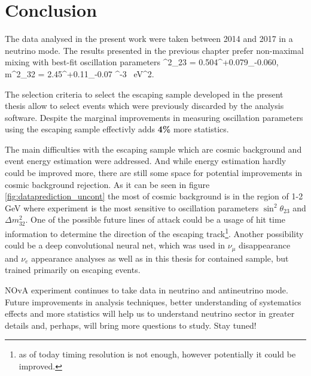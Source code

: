 \chapter{Conclusion}
\label{conclusion_chapter}

The data analysed in the present work were taken between 2014 and 2017 in a neutrino mode. The results 
presented in the previous chapter prefer non-maximal mixing with best-fit oscillation parameters 
\be
\sin^2\theta_{23} = 0.504^{+0.079}_{-0.060}, \nn
\ee
\be
\Delta m^2_{32} = 2.45^{+0.11}_{-0.07} ^{-3}~ eV^2. \nn
\ee

The selection criteria to select the escaping sample developed in the present thesis allow to select
events which were previously discarded by the analysis software. Despite the marginal improvements in measuring
oscillation parameters using the escaping sample effectivly adds \textbf{4\%} more statistics.

The main difficulties with the escaping sample which are cosmic background and event energy estimation were 
addressed. And while energy estimation hardly could be improved more, there are still some space for potential 
improvements in cosmic background rejection. As it can be seen in figure \ref{fig:dataprediction_uncont} the most 
of cosmic background is in the region of 1-2 GeV where experiment is the most sensitive to oscillation 
parameters $\sin^2\theta_{23}$ and $\Delta m^2_{32}$. One of the possible future lines of attack could be a
usage of hit time information to determine the direction of the escaping track\footnote{as of today timing resolution
is not enough, however potentially it could be improved.}. Another possibility could be a deep convolutional neural
net, which was used in $\nu_\mu$ disappearance and $\nu_e$ appearance analyses as well as in this thesis for contained sample,
but trained primarily on escaping events. 

NOvA experiment continues to take data in neutrino and antineutrino mode. Future improvements in analysis techniques,
better understanding of systematics effects and more statistics will help us to understand neutrino sector in greater details 
and, perhaps, will bring more questions to study. Stay tuned!

